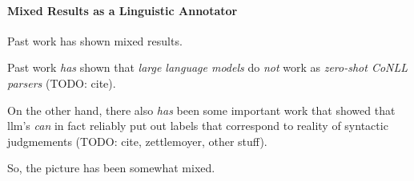\label{sec:discussion}

\paragraph{Mixed Results as a Linguistic Annotator}
Past work has shown mixed results.

Past work {\em has} shown that {\em large language models} do {\em not} work as {\em zero-shot CoNLL parsers} (TODO: cite).

On the other hand, there also {\em has} been some important work that showed that llm's {\em can} in fact reliably put out labels that correspond to reality of syntactic judgmements (TODO: cite, zettlemoyer, other stuff).

So, the picture has been somewhat mixed.



